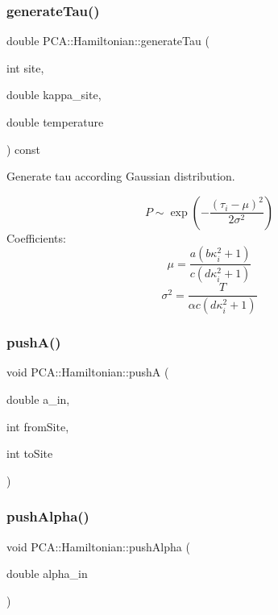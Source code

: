 \subsubsection{\texorpdfstring{generate\+Tau()}{generateTau()}}
{\footnotesize\ttfamily double P\+C\+A\+::\+Hamiltonian\+::generate\+Tau (\begin{DoxyParamCaption}\item[{int}]{site,  }\item[{double}]{kappa\+\_\+site,  }\item[{double}]{temperature }\end{DoxyParamCaption}) const}



Generate tau according Gaussian distribution. 

\[P\sim \exp\left(-\frac{(\tau_i-\mu)^2}{2\sigma^2}\right)\] Coefficients\+: \[\mu=\frac{a(b\kappa_i^2+1)}{c(d\kappa_i^2+1)}\] \[\sigma^2=\frac{T}{\alpha c(d\kappa_i^2+1)}\] \hypertarget{class_p_c_a_1_1_hamiltonian_aacf57a40855dbf2e27f598b0af2fcba3}{}\label{class_p_c_a_1_1_hamiltonian_aacf57a40855dbf2e27f598b0af2fcba3} 
\subsubsection{\texorpdfstring{push\+A()}{pushA()}}
{\footnotesize\ttfamily void P\+C\+A\+::\+Hamiltonian\+::pushA (\begin{DoxyParamCaption}\item[{double}]{a\+\_\+in,  }\item[{int}]{from\+Site,  }\item[{int}]{to\+Site }\end{DoxyParamCaption})}

\hypertarget{class_p_c_a_1_1_hamiltonian_aa1acb10e2078e74b747892db50a0342c}{}\label{class_p_c_a_1_1_hamiltonian_aa1acb10e2078e74b747892db50a0342c} 
\subsubsection{\texorpdfstring{push\+Alpha()}{pushAlpha()}}
{\footnotesize\ttfamily void P\+C\+A\+::\+Hamiltonian\+::push\+Alpha (\begin{DoxyParamCaption}\item[{double}]{alpha\+\_\+in }\end{DoxyParamCaption})}

